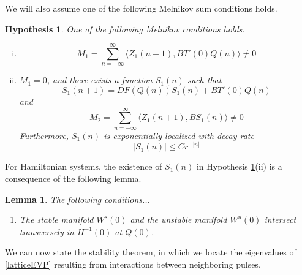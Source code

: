 \documentclass[12pt]{article}
\newtheorem{lemma}{Lemma}
\newtheorem{hypothesis}{Hypothesis}
\begin{document}
We will also assume one of the following Melnikov sum conditions holds.
\begin{hypothesis}\label{melnikovhyp}
One of the following Melnikov conditions holds.
\begin{enumerate}[(i)]
\item
\begin{equation}\label{M1cond}
M_1 = \sum_{n=-\infty}^\infty \langle Z_1(n+1), B T'(0)Q(n) \rangle \neq 0
\end{equation}
\item $M_1 = 0$, and there exists a function $S_1(n)$ such that
\begin{equation}\label{S1def}
S_1(n+1) = DF(Q(n)) S_1(n) + B T'(0)Q(n)
\end{equation}
and 
\begin{equation}\label{M2cond}
M_2 = \sum_{n=-\infty}^\infty \langle Z_1(n+1), B S_1(n) \rangle \neq 0 
\end{equation}
Furthermore, $S_1(n)$ is exponentially localized with decay rate
\begin{equation}\label{S1decay}
|S_1(n)| \leq C r^{-|n|}
\end{equation}
\end{enumerate}
\end{hypothesis}
For Hamiltonian systems, the existence of $S_1(n)$ in Hypothesis \ref{melnikovhyp}(ii) is a consequence of the following lemma.

\begin{lemma}
The following conditions...
\begin{enumerate}
\item The stable manifold $W^s(0)$ and the unstable manifold $W^u(0)$ intersect transversely in $H^{-1}(0)$ at $Q(0)$.
\end{enumerate}
\end{lemma}

We can now state the stability theorem, in which we locate the eigenvalues of \eqref{latticeEVP} resulting from interactions between neighboring pulses.
\end{document}
